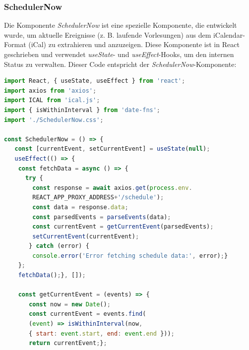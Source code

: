 \subsubsection{SchedulerNow}
Die Komponente \emph{SchedulerNow} ist eine spezielle Komponente, die entwickelt wurde, um  aktuelle Ereignisse (z. B. laufende Vorlesungen) aus dem iCalendar-Format (iCal) zu extrahieren und anzuzeigen. Diese Komponente ist in React geschrieben und verwendet \emph{useState}- und \emph{useEffect}-Hooks, um den internen Status zu verwalten. Dieser Code entspricht der \emph{SchedulerNow}-Komponente:

\begin{lstlisting}[language=JavaScript,
	frame=single,           % Ein Rahmen um den Code
	framexleftmargin=15pt,  % Rahmen link von den Zahlen
	style=algoBericht,
	label={SchedulerNow-Komponente},
	captionpos=b ,          % Caption unter den Code setzen
	caption={SchedulerNow-Komponente}]
import React, { useState, useEffect } from 'react';
import axios from 'axios';
import ICAL from 'ical.js';
import { isWithinInterval } from 'date-fns';
import './SchedulerNow.css';

const SchedulerNow = () => {
   const [currentEvent, setCurrentEvent] = useState(null);
   useEffect(() => {
   	const fetchData = async () => {
   	  try {
   	    const response = await axios.get(process.env.
   	    REACT_APP_PROXY_ADDRESS+'/schedule');
   	    const data = response.data;
   	    const parsedEvents = parseEvents(data);
   	    const currentEvent = getCurrentEvent(parsedEvents);
   	    setCurrentEvent(currentEvent);
       } catch (error) {
        console.error('Error fetching schedule data:', error);}
    };
    fetchData();}, []);
    
    const getCurrentEvent = (events) => {
       const now = new Date();
       const currentEvent = events.find(
       (event) => isWithinInterval(now, 
       { start: event.start, end: event.end }));
       return currentEvent;};
   

\end{lstlisting}
